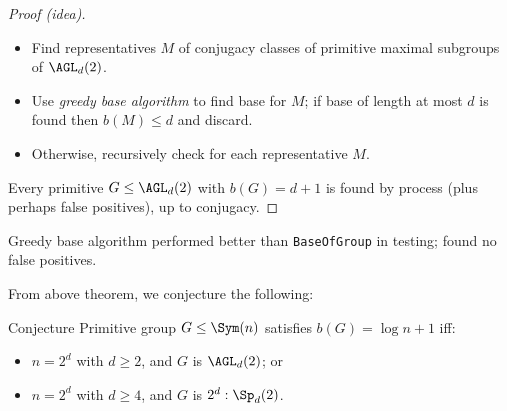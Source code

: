 \begin{slide}
    \begin{proof}[Proof (idea)]
        \begin{itemize}
            \item Find representatives $M$ of conjugacy classes of primitive maximal subgroups of $\AGL_d(2)$. \pause
            \item Use \textit{greedy base algorithm} to find base for $M$; if base of length at most $d$ is found then $b(M) \leq d$ and discard. \pause
            \item Otherwise, recursively check for each representative $M$.
        \end{itemize} \pause

        Every primitive $G \leq \AGL_d(2)$ with $b(G) = d + 1$ is found by process (plus perhaps false positives), up to conjugacy.
    \end{proof}

    Greedy base algorithm performed better than \texttt{BaseOfGroup} in testing; found no false positives.
\end{slide}

\begin{slide}
    From above theorem, we conjecture the following:

    \begin{alertblock}{Conjecture}
        \vspace{0pt}
        Primitive group $G \leq \Sym(n)$ satisfies $b(G) = \log n + 1$ iff: \pause
        \begin{itemize}
            \item $n = 2^d$ with $d \geq 2$, and $G$ is $\AGL_d(2)$; or
            \item $n = 2^d$ with $d \geq 4$, and $G$ is $2^d : \Sp_d(2)$.
        \end{itemize}
    \end{alertblock}
\end{slide}